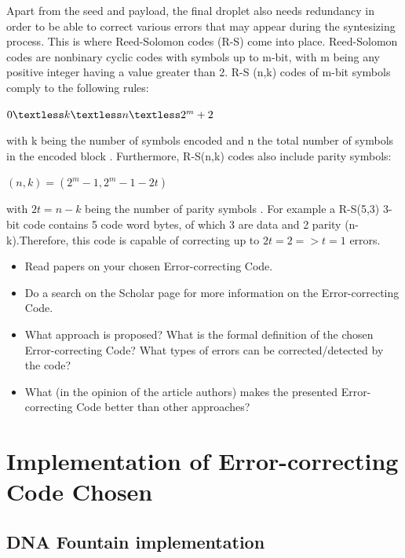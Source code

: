 \documentclass[12pt]%
{article}
\begin{document}
Apart from the seed and payload, the final droplet also needs redundancy in order to be able to correct various errors that may appear during the syntesizing process. This is where Reed-Solomon codes (R-S) come into place. Reed-Solomon codes are nonbinary cyclic codes with symbols up to m-bit, with m being any positive integer having a value greater than 2. R-S (n,k) codes of m-bit symbols comply to the following rules:
\begin{center}

$0 \textless k \textless n \textless 2^m +2$

\end{center}

with k being the number of symbols encoded and n the total number of symbols in the encoded block \cite{sklar2001reed}. Furthermore, R-S(n,k) codes also include parity symbols:

\begin{center}

$(n,k)=(2^m - 1, 2^m -1 - 2t)$

\end{center}

with $2t = n - k$ being the number of parity symbols \cite{sklar2001reed}. For example a R-S(5,3) 3-bit code  contains 5 code word bytes, of which 3 are data and 2 parity (n-k).Therefore, this code is capable of correcting up to $2t=2   => t = 1$ errors.

\begin{itemize}
\item Read papers on your chosen  Error-correcting Code.
\item Do a search on the Scholar page for more information on the Error-correcting Code.
\item What approach is proposed? What is the formal definition of the chosen Error-correcting Code? What types of errors can be corrected/detected by the code? 
\item What (in the opinion of the article authors) makes the presented Error-correcting Code better than other approaches? 
\end{itemize}

\section{Implementation of  Error-correcting Code Chosen}

\subsection{DNA Fountain implementation}
\end{document}
